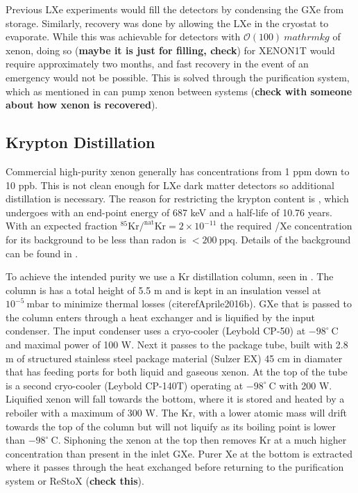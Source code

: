 Previous LXe experiments would fill the detectors by condensing the GXe from storage.  Similarly, recovery was done by allowing the LXe
in the cryostat to evaporate.  While this was achievable for detectors with $\mathcal{O}(100)\ mathrm{kg}$ of xenon, doing so
(\textbf{maybe it is just for filling, check}) for XENON1T would require approximately two months, and fast recovery in the event of an
emergency would not be possible.  This is solved through the purification system, which as mentioned in  can
pump xenon between systems (\textbf{check with someone about how xenon is recovered}).



\subsection{Krypton Distillation}
\label{subsec:xenon1t_kr_dist}
Commercial high-purity xenon generally has  concentrations from 1 ppm down to 10 ppb.  This is not clean enough for LXe dark matter
detectors so additional distillation is necessary.  The reason for restricting the
krypton content is , which undergoes \betadecay with an end-point energy of 687 keV and a half-life of 10.76 years.  With
an expected fraction $\mathrm{^{85}Kr / ^{nat}Kr = 2 \times 10^{-11}}$ the required /Xe concentration for its background to be
less than radon is $< 200\ \mathrm{ppq}$.  Details of the  background can be found in .

To achieve the intended purity we use a Kr distillation column, seen in .  The column is has a total
height of 5.5 m and is kept in an insulation vessel at $10^{-5}\ \mathrm{mbar}$ to minimize thermal losses (citeref{Aprile2016b}).  GXe
that is passed to the column enters through a heat exchanger and is
liquified by the input condenser.  The input condenser uses a cryo-cooler (Leybold CP-50) at $-98^{\circ}\ \mathrm{C}$ and maximal power
of 100 W.  Next it passes to the package tube, built with 2.8 m of structured stainless steel package material (Sulzer EX) 45 cm in
diamater that has feeding ports for both liquid and gaseous xenon.  At the top of the tube is a second cryo-cooler (Leybold CP-140T)
operating at $-98^{\circ}\ \mathrm{C}$ with 200 W.  Liquified xenon will fall towards the bottom, where it is stored and heated by a
reboiler with a maximum of 300 W.  The Kr, with a lower atomic mass will drift towards the top of the column but will not liquify as its
boiling point is lower than $-98^{\circ}\ \mathrm{C}$.  Siphoning the xenon at the top then removes Kr at a much higher concentration than
present in the inlet GXe.  Purer Xe at the bottom is extracted where it passes through the heat exchanged before returning to the
purification system or ReStoX (\textbf{check this}).

